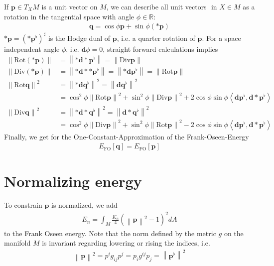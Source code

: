 \documentclass[a4paper,11pt]{scrartcl}
\newcommand{\exd}{\mathbf{d}}
\newcommand{\Div}{\text{Div}}
\newcommand{\Rot}{\text{Rot}}
\newcommand{\R}{\mathds{R}}
\newcommand{\M}{M}
\newcommand{\dA}{dA}
\newcommand{\p}{\mathbf{p}}
\newcommand{\q}{\mathbf{q}}
\newcommand{\pfl}{\mathbf{p}^{\flat}}
\newcommand{\qfl}{\mathbf{q}^{\flat}}
\newcommand{\EOS}{E_{\text{FO}}}
\newcommand{\EN}{E_{n}}
\begin{document}
  If \( \p\in T_{X}\M \) is a unit vector on \( \M \), we can describe all unit vectors \(  \) in \( X\in\M \) as a rotation in the tangential space
  with angle \( \phi\in\R \):
  \begin{align}
    \q = \cos\phi\p + \sin\phi\left( *\p \right)
  \end{align}
  \( *\p = \left( *\pfl \right)^{\sharp}\) is the Hodge dual of \( \p \), i.e. a quarter rotation of \( \p \). 
  For a space independent angle \( \phi \), i.e. \( \exd\phi=0 \), straight forward calculations implies
  \begin{align}
     \left\| \Rot (*\p) \right\| &=  \left\| *\exd*\pfl \right\| = \left\| \Div\p \right\|\\
     \left\| \Div (*\p) \right\| &= \left\| *\exd**\pfl  \right\| = \left\| *\exd\pfl  \right\| = \left\|\Rot\p\right\|\\ 
     \left\| \Rot\q \right\|^{2} &= \left\| *\exd\qfl \right\|^{2} = \left\| \exd\qfl \right\|^{2} \\
                                      &=  \cos^{2}\phi\left\| \Rot\p \right\|^{2} 
                                        + \sin^{2}\phi\left\| \Div\p \right\|^{2}
                                        + 2\cos\phi\sin\phi\left\langle \exd\pfl, \exd * \pfl \right\rangle\\
    \left\| \Div\q \right\|^{2} &= \left\| *\exd*\qfl \right\|^{2} = \left\| \exd*\qfl \right\|^{2}\\
                                     &= \cos^{2}\phi\left\| \Div\p \right\|^{2} 
                                        + \sin^{2}\phi\left\| \Rot\p \right\|^{2}
                                        - 2\cos\phi\sin\phi\left\langle \exd\pfl, \exd * \pfl \right\rangle  
  \end{align}
  Finally, we get for the One-Constant-Approximation of the Frank-Oseen-Energy
  \begin{align}
    \EOS[\q] = \EOS[\p]
  \end{align}


\section{Normalizing energy}

To constrain \( \p \) is normalized, we add
\begin{align}
  \EN = \int_{\M} \frac{K_{n}}{4} \left( \left\| \p \right\|^{2} - 1 \right)^{2} \dA
\end{align}
to the Frank Oseen energy.
Note that the norm defined by the metric \( g \) on the manifold \( \M \) is invariant regarding lowering or rising the indices, i.e.
\begin{align}
  \left\| \p \right\|^{2} = p^{i}g_{ij}p^{j} = p_{i} g^{ij} p_{j} = \left\| \pfl \right\|^{2}
\end{align}
\end{document}
